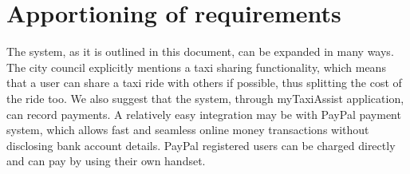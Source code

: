 \section{Apportioning of requirements}
The system, as it is outlined in this document, can be expanded in many ways. The city council explicitly mentions a taxi sharing functionality, which means that a user can share a taxi ride with others if possible, thus splitting the cost of the ride too.
We also suggest that the system, through myTaxiAssist application, can record payments. A relatively easy integration may be with PayPal payment system, which allows fast and seamless online money transactions without disclosing bank account details. PayPal registered users can be charged directly and can pay by using their own handset. 














